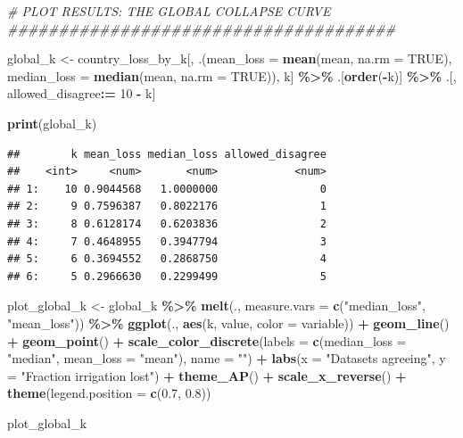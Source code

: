 \documentclass[
  11pt,
]{article}
\newenvironment{Shaded}{\begin{snugshade}}{\end{snugshade}}
\newcommand{\AttributeTok}[1]{\textcolor[rgb]{0.13,0.29,0.53}{#1}}
\newcommand{\CommentTok}[1]{\textcolor[rgb]{0.56,0.35,0.01}{\textit{#1}}}
\newcommand{\ConstantTok}[1]{\textcolor[rgb]{0.56,0.35,0.01}{#1}}
\newcommand{\DecValTok}[1]{\textcolor[rgb]{0.00,0.00,0.81}{#1}}
\newcommand{\FloatTok}[1]{\textcolor[rgb]{0.00,0.00,0.81}{#1}}
\newcommand{\FunctionTok}[1]{\textcolor[rgb]{0.13,0.29,0.53}{\textbf{#1}}}
\newcommand{\NormalTok}[1]{#1}
\newcommand{\OtherTok}[1]{\textcolor[rgb]{0.56,0.35,0.01}{#1}}
\newcommand{\SpecialCharTok}[1]{\textcolor[rgb]{0.81,0.36,0.00}{\textbf{#1}}}
\newcommand{\StringTok}[1]{\textcolor[rgb]{0.31,0.60,0.02}{#1}}
\begin{document}
\begin{Shaded}
\begin{Highlighting}[]
\CommentTok{\# PLOT RESULTS: THE GLOBAL COLLAPSE CURVE \#\#\#\#\#\#\#\#\#\#\#\#\#\#\#\#\#\#\#\#\#\#\#\#\#\#\#\#\#\#\#\#\#\#\#\#\#\#}

\NormalTok{global\_k }\OtherTok{\textless{}{-}}\NormalTok{ country\_loss\_by\_k[, .(}\AttributeTok{mean\_loss   =} \FunctionTok{mean}\NormalTok{(mean, }\AttributeTok{na.rm =} \ConstantTok{TRUE}\NormalTok{),}
                                  \AttributeTok{median\_loss =} \FunctionTok{median}\NormalTok{(mean, }\AttributeTok{na.rm =} \ConstantTok{TRUE}\NormalTok{)), k] }\SpecialCharTok{\%\textgreater{}\%}
\NormalTok{  .[}\FunctionTok{order}\NormalTok{(}\SpecialCharTok{{-}}\NormalTok{k)] }\SpecialCharTok{\%\textgreater{}\%}
\NormalTok{  .[, allowed\_disagree}\SpecialCharTok{:=} \DecValTok{10} \SpecialCharTok{{-}}\NormalTok{ k]}

\FunctionTok{print}\NormalTok{(global\_k)}
\end{Highlighting}
\end{Shaded}

\begin{verbatim}
##        k mean_loss median_loss allowed_disagree
##    <int>     <num>       <num>            <num>
## 1:    10 0.9044568   1.0000000                0
## 2:     9 0.7596387   0.8022176                1
## 3:     8 0.6128174   0.6203836                2
## 4:     7 0.4648955   0.3947794                3
## 5:     6 0.3694552   0.2868750                4
## 6:     5 0.2966630   0.2299499                5
\end{verbatim}

\begin{Shaded}
\begin{Highlighting}[]
\NormalTok{plot\_global\_k }\OtherTok{\textless{}{-}}\NormalTok{ global\_k }\SpecialCharTok{\%\textgreater{}\%}
  \FunctionTok{melt}\NormalTok{(., }\AttributeTok{measure.vars =} \FunctionTok{c}\NormalTok{(}\StringTok{"median\_loss"}\NormalTok{, }\StringTok{"mean\_loss"}\NormalTok{)) }\SpecialCharTok{\%\textgreater{}\%}
  \FunctionTok{ggplot}\NormalTok{(., }\FunctionTok{aes}\NormalTok{(k, value, }\AttributeTok{color =}\NormalTok{ variable)) }\SpecialCharTok{+}
  \FunctionTok{geom\_line}\NormalTok{() }\SpecialCharTok{+}
  \FunctionTok{geom\_point}\NormalTok{()  }\SpecialCharTok{+}
  \FunctionTok{scale\_color\_discrete}\NormalTok{(}\AttributeTok{labels =} \FunctionTok{c}\NormalTok{(}\AttributeTok{median\_loss =} \StringTok{"median"}\NormalTok{, }\AttributeTok{mean\_loss =} \StringTok{"mean"}\NormalTok{),}
                       \AttributeTok{name =} \StringTok{""}\NormalTok{) }\SpecialCharTok{+}
  \FunctionTok{labs}\NormalTok{(}\AttributeTok{x =} \StringTok{"Datasets agreeing"}\NormalTok{, }\AttributeTok{y =} \StringTok{"Fraction irrigation lost"}\NormalTok{) }\SpecialCharTok{+}
  \FunctionTok{theme\_AP}\NormalTok{() }\SpecialCharTok{+}
  \FunctionTok{scale\_x\_reverse}\NormalTok{() }\SpecialCharTok{+}
  \FunctionTok{theme}\NormalTok{(}\AttributeTok{legend.position =} \FunctionTok{c}\NormalTok{(}\FloatTok{0.7}\NormalTok{, }\FloatTok{0.8}\NormalTok{))}

\NormalTok{plot\_global\_k}
\end{Highlighting}
\end{Shaded}
\end{document}

